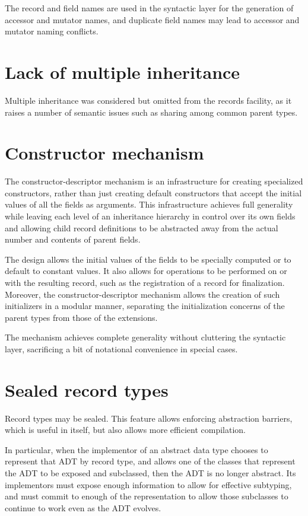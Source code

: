 \documentclass[twoside,twocolumn]{algol60}
\begin{document}
The record and field names are used in the syntactic layer for the
generation of accessor and mutator names, and duplicate field names
may lead to accessor and mutator naming conflicts.

\section{Lack of multiple inheritance}

Multiple inheritance was considered but omitted from the records
facility, as it raises a number of semantic issues such as sharing
among common parent types.

\section{Constructor mechanism}

The constructor-descriptor mechanism is an infra\-struc\-ture for
creating specialized constructors, rather than just creating default
constructors that accept the initial values of all the fields as
arguments. This infrastructure achieves full generality while leaving
each level of an inheritance hierarchy in control over its own fields
and allowing child record definitions to be abstracted away from the
actual number and contents of parent fields.

The design allows the initial values of the fields to be specially
computed or to default to constant values. It also allows for
operations to be performed on or with the resulting record, such as
the registration of a record for finalization. Moreover, the
constructor-descriptor mechanism allows the creation of such
initializers in a modular manner, separating the initialization
concerns of the parent types from those of the extensions.

The mechanism achieves complete generality without cluttering the
syntactic layer, sacrificing a bit of notational convenience in
special cases.

\section{Sealed record types}

Record types may be sealed.  This feature allows enforcing abstraction
barriers, which is useful in itself, but also allows more efficient
compilation.

In particular, when the implementor of an abstract data type chooses
to represent that ADT by record type, and allows one of the classes
that represent the ADT to be exposed and subclassed, then the ADT is
no longer abstract.  Its implementors must expose enough information
to allow for effective subtyping, and must commit to enough of the
representation to allow those subclasses to continue to work even as
the ADT evolves.
\end{document}
